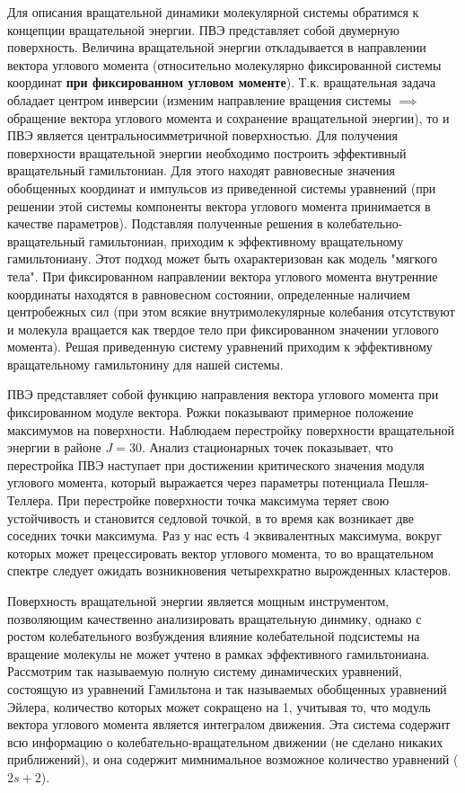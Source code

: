 \documentclass[12pt]{article}
\begin{document}
Для описания вращательной динамики молекулярной системы обратимся к концепции вращательной энергии. ПВЭ представляет собой двумерную поверхность. Величина вращательной энергии откладывается в направлении вектора углового момента (относительно молекулярно фиксированной системы координат \textbf{при фиксированном угловом моменте}). Т.к. вращательная задача обладает центром инверсии (изменим направление вращения системы $\implies$ обращение вектора углового момента и сохранение вращательной энергии), то и ПВЭ является центральносимметричной поверхностью. Для получения поверхности вращательной энергии необходимо построить эффективный вращательный гамильтониан. Для этого находят равновесные значения обобщенных координат и импульсов из приведенной системы уравнений (при решении этой системы компоненты вектора углового момента принимается в качестве параметров). Подставляя полученные решения в колебательно-вращательный гамильтониан, приходим к эффективному вращательному гамильтониану. Этот подход может быть охарактеризован как модель "мягкого тела". При фиксированном направлении вектора углового момента внутренние координаты находятся в равновесном состоянии, определенные наличием центробежных сил (при этом всякие внутримолекулярные колебания отсутствуют и молекула вращается как твердое тело при фиксированном значении углового момента). Решая приведенную систему уравнений приходим к эффективному вращательному гамильтонину для нашей системы. \par
ПВЭ представляет собой функцию направления вектора углового момента при фиксированном модуле вектора. Рожки показывают примерное положение максимумов на поверхности. Наблюдаем перестройку поверхности вращательной энергии в районе $J=30$. Анализ стационарных точек показывает, что перестройка ПВЭ наступает при достижении критического значения модуля углового момента, который выражается через параметры потенциала Пешля-Теллера. При перестройке поверхности точка максимума теряет свою устойчивость и становится седловой точкой, в то время как возникает две соседних точки максимума.
Раз у нас есть 4 эквивалентных максимума, вокруг которых может прецессировать вектор углового момента, то во вращательном спектре следует ожидать возникновения четырехкратно вырожденных кластеров. \par
Поверхность вращательной энергии является мощным инструментом, позволяющим качественно анализировать вращательную динмику, однако с ростом колебательного возбуждения влияние колебательной подсистемы на вращение молекулы не может учтено в рамках эффективного гамильтониана. Рассмотрим так называемую полную систему динамических уравнений, состоящую из уравнений Гамильтона и так называемых обобщенных уравнений Эйлера, количество которых может сокращено на 1, учитывая то, что модуль вектора углового момента является интегралом движения. Эта система содержит всю информацию о колебательно-вращательном движении (не сделано никаких приближений), и она содержит мимнимальное возможное количество уравнений ($2s+2$). \par
\end{document}
